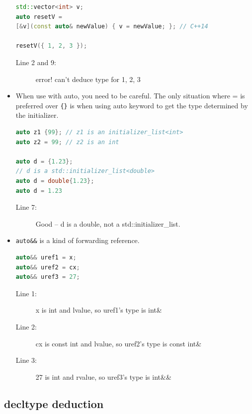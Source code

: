 \documentclass[a4paper,11pt,twoside]{book}
\begin{document}
\begin{itemize}
\begin{lstlisting}[frame=single, language=c++]
std::vector<int> v;
auto resetV =
[&v](const auto& newValue) { v = newValue; }; // C++14
	
resetV({ 1, 2, 3 }); 
\end{lstlisting}
\begin{description}
	\item[Line 2 and 9:] error! can't deduce type for { 1, 2, 3 }
\end{description}
	
	\item When use with auto, you need to be careful. The only situation where = is preferred over \verb={}= is when using auto keyword to get the type determined by the initializer.
\begin{lstlisting}[frame=single, language=c++]
auto z1 {99}; // z1 is an initializer_list<int>
auto z2 = 99; // z2 is an int

auto d = {1.23};
// d is a std::initializer_list<double>
auto d = double{1.23};
auto d = 1.23
\end{lstlisting}
\begin{description}
	\item[Line 7:] Good -- d is a double, not a std::initializer\_list.
\end{description}

	
	\item \texttt{auto\&\&} is a kind of forwarding reference.
\begin{lstlisting}[frame=single, language=c++]
auto&& uref1 = x; 
auto&& uref2 = cx; 
auto&& uref3 = 27; 
\end{lstlisting}
\begin{description}
	\item[Line 1:] x is int and lvalue, so uref1's type is int\&
	\item[Line 2:] cx is const int and lvalue, so uref2's type is const int\&
	\item[Line 3:] 27 is int and rvalue, so uref3's type is int\&\&
\end{description}

\end{itemize}



\subsection{decltype deduction}
\end{document}
